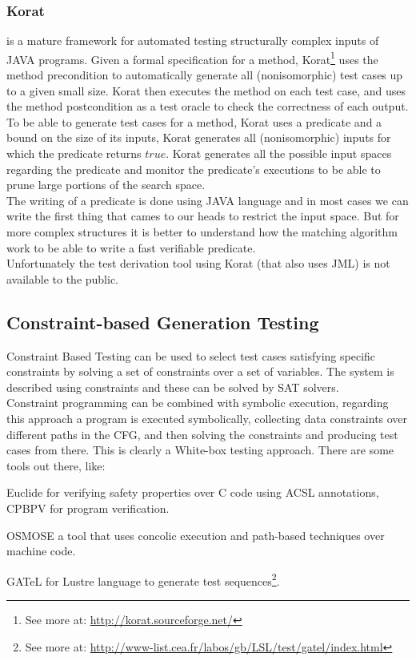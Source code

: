 \documentclass[10pt, conference, compsocconf]{IEEEtran}
\begin{document}
\subsubsection{\textbf{Korat}\cite{Boyapati02korat:automated}}
is a mature framework for automated testing structurally complex inputs of JAVA programs.
Given a formal specification for a method, Korat\footnote{See more at: \url{http://korat.sourceforge.net/}} uses the method precondition
to automatically generate all (nonisomorphic) test cases up to a given small size.
Korat then executes the method on each test case, and uses the method postcondition as a test oracle to check the correctness of each output.\\
To be able to generate test cases for a method, Korat uses a predicate and a bound on the size of its inputs,
Korat generates all (nonisomorphic) inputs for which the predicate returns $true$.
Korat generates all the possible input spaces regarding the predicate and monitor the predicate's executions to be able to prune large portions of the search space.\\
\indent The writing of a predicate is done using JAVA language and in most cases we can write the first thing that cames to our heads to restrict the input space.
But for more complex structures it is better to understand how the matching algorithm work to be able to write a fast verifiable predicate.\\
Unfortunately the test derivation tool using Korat (that also uses JML) is not available to the public.

\subsection{Constraint-based Generation Testing}
Constraint Based Testing\cite{DeMillo91constraint-basedautomatic} can be used to select test cases satisfying specific constraints by
solving a set of constraints over a set of variables. The system is described using constraints and these can be solved by SAT solvers.\\
Constraint programming can be combined with symbolic execution, regarding this approach a program is executed symbolically,
collecting data constraints over different paths in the CFG, and then solving the constraints and producing test cases from there.
This is clearly a White-box testing approach.
There are some tools out there, like:

\begin{basedescript}{\desclabelstyle{\pushlabel}}
\item[Euclide] for verifying safety properties over C code using ACSL annotations, CPBPV for program verification.
\item[OSMOSE] a tool that uses concolic execution and path-based techniques over machine code.
\item[GATeL] for Lustre language to generate test sequences\footnote{See more at: \url{http://www-list.cea.fr/labos/gb/LSL/test/gatel/index.html}}.
\end{basedescript}
\end{document}
